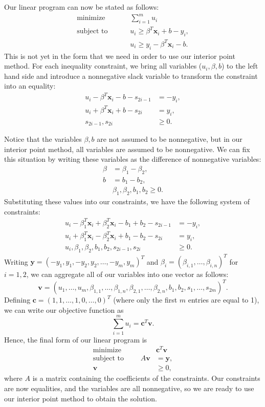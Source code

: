 Our linear program can now be stated as follows:
\begin{align*}
\text{minimize }\qquad &\sum_{i=1}^m u_i\\
\text{subject to }\qquad &u_i \geq \beta^T\mathbf{x}_i + b - y_i,\\
&u_i \geq y_i - \beta^T\mathbf{x}_i - b.
\end{align*}
This is not yet in the form that we need in order to use our interior point method.
For each inequality constraint, we bring all variables ($u_i, \beta, b$) to the left hand side and
introduce a nonnegative slack variable to transform the constraint into an equality:
\begin{align*}
u_i  - \beta^T\mathbf{x}_i - b - s_{2i-1}&= -y_i,\\
u_i +\beta^T\mathbf{x}_i + b - s_{2i}&= y_i,\\
s_{2i-1}, s_{2i}&\geq 0.
\end{align*}

Notice that the variables $\beta, b$ are not assumed to be nonnegative, but in our interior point method, all variables are assumed
to be nonnegative. We can fix this situation by writing these variables as the difference of nonnegative variables:
\begin{align*}
  \beta &= \beta_1 - \beta_2,\\
  b &= b_1 - b_2,\\
  &\beta_1, \beta_2, b_1, b_2 \geq 0.
\end{align*}
Substituting these values into our constraints, we have the following system of constraints:
\begin{align*}
u_i  - \beta_1^T\mathbf{x}_i + \beta_2^T\mathbf{x}_i - b_1 + b_2 - s_{2i-1}&= -y_i,\\
u_i + \beta_1^T\mathbf{x}_i - \beta_2^T\mathbf{x}_i + b_1 - b_2 - s_{2i}&= y_i,\\
u_i, \beta_1, \beta_2, b_1, b_2, s_{2i-1}, s_{2i}&\geq 0.
\end{align*}
Writing $\mathbf{y} = (-y_1, y_1, -y_2, y_2, \ldots, -y_m, y_m)^T$ and $\beta_i = (\beta_{i,1}, \ldots, \beta_{i,n})^T$ for $i = 1, 2$,
we can aggregate all of our variables into one vector as follows:
\[
\mathbf{v} = (u_1,\ldots, u_m, \beta_{1,1},\ldots, \beta_{1,n}, \beta_{2,1},\ldots, \beta_{2,n}, b_1, b_2, s_1,\ldots,s_{2m})^T.
\]
Defining $\mathbf{c} = (1, 1, \ldots, 1, 0, \ldots, 0)^T$ (where only the first $m$ entries are equal to 1), we can write our
objective function as
\[
\sum_{i=1}^m u_i = \mathbf{c}^T\mathbf{v}.
\]
Hence, the final form of our linear program is
\begin{align*}
  \text{minimize }\qquad &\mathbf{c}^T\mathbf{v}\\
  \text{subject to }\qquad A\mathbf{v} &= \mathbf{y},\\
  \mathbf{v} &\geq 0,
\end{align*}
where $A$ is a matrix containing the coefficients of the constraints.
Our constraints are now equalities, and the variables are all nonnegative, so we are ready to use our interior point method to obtain
the solution.

